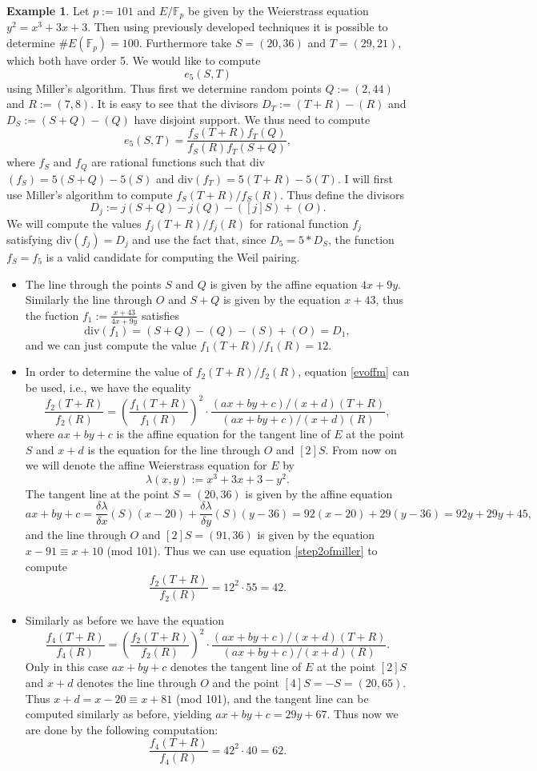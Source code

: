 \documentclass{article}
\numberwithin{equation}{section}
\theoremstyle{definition}
\newtheorem{example}[theorem]{Example}
\newcommand{\FF}[1]{{\mathbb F}_{#1}} %
\begin{document}
\begin{example}
Let $p:=101$ and $E/\FF{p}$ be given by the Weierstrass equation $y^2=x^3+3x+3$. Then using previously developed techniques it is possible to determine $\#E(\FF{p})=100$. Furthermore take $S=(20,36)$ and $T=(29,21)$, which both have order 5. We would like to compute $$e_5(S,T)$$ using Miller's algorithm. Thus first we determine random points $Q:=(2,44)$ and $R:=(7,8) $. It is easy to see that the divisors $D_T:=(T+R)-(R)$ and $D_S:=(S+Q)-(Q)$ have disjoint support. We thus need to compute $$e_5(S,T)=\frac{f_S(T+R)f_T(Q)}{f_S(R)f_T(S+Q)},$$ where $f_S$ and $f_Q$ are rational functions such that div$(f_S)=5(S+Q)-5(S)$ and div$(f_T)=5(T+R)-5(T)$. I will first use Miller's algorithm to compute $f_S(T+R)/f_S(R)$. Thus define the divisors $$D_j:=j(S+Q)-j(Q)-([j]S)+(O).$$ We will compute the values $f_j(T+R)/f_j(R)$ for rational function $f_j$ satisfying div$(f_j) = D_j$ and use the fact that, since $D_5=5*D_S$, the function $f_S=f_5$ is a valid candidate for computing the Weil pairing. 
\begin{itemize}
\item The line through the points $S$ and $Q$ is given by the affine equation $4x+9y$. Similarly the line through $O$ and $S+Q$ is given by the equation $x+43$, thus the fuction $f_1:=\frac{x+43}{4x+9y}$ satisfies $$\text{div}(f_1)=(S+Q)-(Q)-(S)+(O)=D_1,$$ and we can just compute the value $f_1(T+R)/f_1(R)=12$.
\item In order to determine the value of $f_2(T+R)/f_2(R)$, equation \ref{evoffm} can be used, i.e., we have the equality \begin{equation}\label{step2ofmiller}\frac{f_2(T+R)}{f_2(R)}=\left(\frac{f_1(T+R)}{f_1(R)}\right)^2\cdot \frac{(ax+by+c)/(x+d)(T+R)}{(ax+by+c)/(x+d)(R)},\end{equation} where $ax+by+c$ is the affine equation for the tangent line of $E$ at the point $S$ and $x+d$ is the equation for the line through $O$ and $[2]S$. From now on we will denote the affine Weierstrass equation for $E$ by  $$\lambda(x,y):=x^3+3x+3-y^2.$$ The tangent line at the point $S=(20,36)$ is given by the affine equation $$ax+by+c=\frac{\delta \lambda}{\delta x} (S)(x-20) + \frac{\delta \lambda}{\delta y} (S)(y-36)= 92(x-20)+29(y-36)=92y+29y+45,$$ and the line through $O$ and $[2]S=(91,36)$ is given by the equation $x-91\equiv x+10$ (mod 101). Thus we can use equation \ref{step2ofmiller} to compute $$\frac{f_2(T+R)}{f_2(R)}=12^2\cdot55=42.$$
\item Similarly as before we have the equation $$\frac{f_4(T+R)}{f_4(R)}=\left(\frac{f_2(T+R)}{f_2(R)}\right)^2\cdot \frac{(ax+by+c)/(x+d)(T+R)}{(ax+by+c)/(x+d)(R)}.$$ Only in this case $ax+by+c$ denotes the tangent line of $E$ at the point $[2]S$ and $x+d$ denotes the line through $O$ and the point $[4]S=-S=(20,65)$. Thus $x+d=x-20\equiv x+81$ (mod 101), and the tangent line can be computed similarly as before, yielding $ax+by+c=29y+67$. Thus now we are done by the following computation: $$\frac{f_4(T+R)}{f_4(R)}=42^2\cdot 40=62.$$

\end{itemize}
\end{example}
\end{document}
